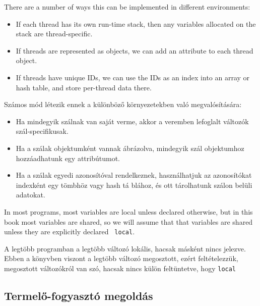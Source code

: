 \documentclass{book}
\newcommand{\clearemptydoublepage}{\newpage\cleardoublepage}
\begin{document}
There are a number of ways this can be implemented in different
environments:

\begin{itemize}

\item If each thread has its own run-time stack, then any variables
allocated on the stack are thread-specific.

\item If threads are represented as objects, we can add an attribute
to each thread object.

\item If threads have unique IDs, we can use the IDs as an index
into an array or hash table, and store per-thread data there.

\end{itemize}


Számos mód létezik ennek a különböző környezetekben való megvalósítására:

\begin{itemize}

\item Ha mindegyik szálnak van saját verme, akkor a veremben lefoglalt változók szál-specifikusak.

\item Ha a szálak objektumként vannak ábrázolva, mindegyik szál objektumhoz hozzáadhatunk egy attribútumot.

\item Ha a szálak egyedi azonosítóval rendelkeznek, használhatjuk az azonosítókat indexként egy tömbhöz vagy hash tá
blához, és ott tárolhatunk szálon belüli adatokat.

\end{itemize}

In most programs, most variables are local unless declared otherwise,
but in this book most variables are shared, so we will assume that
that variables are shared unless they are explicitly declared {\tt
local}.

A legtöbb programban a legtöbb változó lokális, hacsak másként nincs jelezve.
Ebben a könyvben viszont a legtöbb változó megosztott, ezért feltételezzük,
megosztott változókról van szó, hacsak nincs külön feltüntetve, hogy {\tt local}




\clearemptydoublepage
\subsection{Termelő-fogyasztó megoldás}
\end{document}
